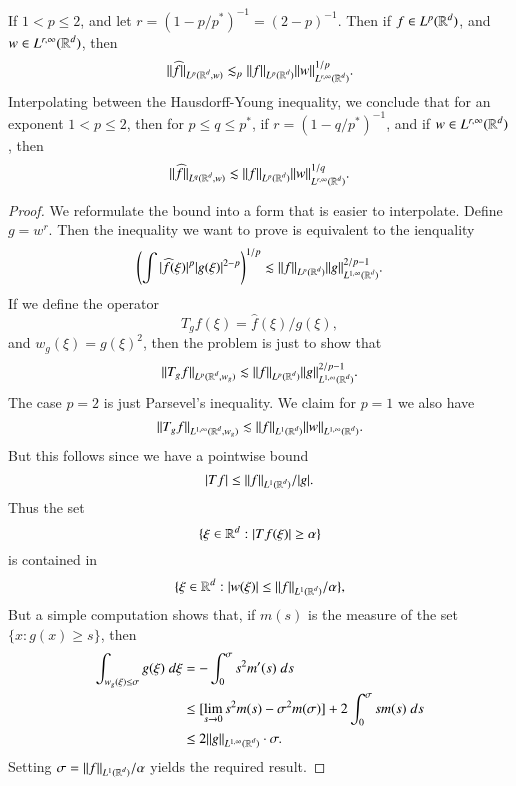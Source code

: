 \begin{corollary}
    If $1 < p \leq 2$, and let $r = (1 - p/p^*)^{-1} = (2-p)^{-1}$. Then if $f \in L^p(\operatorname{\mathbb{R}}^d)$, and $w \in L^{r,\infty}(\operatorname{\mathbb{R}}^d)$, then
    \[ \| \widehat{f} \|_{L^p(\operatorname{\mathbb{R}}^d, w)} \lesssim_p \| f \|_{L^p(\operatorname{\mathbb{R}}^d)} \| w \|_{L^{r,\infty}(\operatorname{\mathbb{R}}^d)}^{1/p}. \]
    Interpolating between the Hausdorff-Young inequality, we conclude that for an exponent $1 < p \leq 2$, then for $p \leq q \leq p^*$, if $r = (1 - q/p^*)^{-1}$, and if $w \in L^{r,\infty}(\operatorname{\mathbb{R}}^d)$, then
    \[ \| \widehat{f} \|_{L^q(\operatorname{\mathbb{R}}^d,w)} \lesssim \| f \|_{L^p(\operatorname{\mathbb{R}}^d)} \| w \|_{L^{r,\infty}(\operatorname{\mathbb{R}}^d)}^{1/q}. \]
\end{corollary}
\begin{proof}
    We reformulate the bound into a form that is easier to interpolate. Define $g = w^r$. Then the inequality we want to prove is equivalent to the ienquality
    \[ \left( \int |\widehat{f}(\xi)|^p |g(\xi)|^{2-p} \right)^{1/p} \lesssim \| f \|_{L^p(\operatorname{\mathbb{R}}^d)} \| g \|_{L^{1,\infty}(\operatorname{\mathbb{R}}^d)}^{2/p - 1}. \]
    If we define the operator
    \[ T_gf(\xi) = \widehat{f}(\xi) / g(\xi), \]
    and $w_g(\xi) = g(\xi)^2$, then the problem is just to show that
    \[ \| T_g f \|_{L^p(\operatorname{\mathbb{R}}^d,w_g)} \lesssim \| f \|_{L^p(\operatorname{\mathbb{R}}^d)} \| g \|_{L^{1,\infty}(\operatorname{\mathbb{R}}^d)}^{2/p - 1}. \]
    The case $p = 2$ is just Parsevel's inequality. We claim for $p = 1$ we also have
    \[ \| T_g f \|_{L^{1,\infty}(\operatorname{\mathbb{R}}^d,w_g)} \lesssim \| f \|_{L^1(\operatorname{\mathbb{R}}^d)} \| w \|_{L^{1,\infty}(\operatorname{\mathbb{R}}^d)}. \]
    But this follows since we have a pointwise bound
    \[ |Tf| \leq \| f \|_{L^1(\operatorname{\mathbb{R}}^d)} / |g|. \]
    Thus the set
    \[ \{ \xi \in \operatorname{\mathbb{R}}^d : |Tf(\xi)| \geq \alpha \} \]
    is contained in
    \[ \{ \xi \in \operatorname{\mathbb{R}}^d : |w(\xi)| \leq \| f \|_{L^1(\operatorname{\mathbb{R}}^d)} / \alpha \}, \]
    But a simple computation shows that, if $m(s)$ is the measure of the set $\{ x : g(x) \geq s \}$, then
    \begin{align*}
        \int_{w_g(\xi) \leq \sigma} g(\xi)\; d\xi &= - \int_0^\sigma s^2 m'(s)\; ds\\
        &\leq [\lim_{s \to 0} s^2 m(s) - \sigma^2 m(\sigma)] + 2 \int_0^\sigma s m(s)\; ds\\
        &\leq 2 \| g \|_{L^{1,\infty}(\operatorname{\mathbb{R}}^d)} \cdot \sigma.
    \end{align*}
    Setting $\sigma = \| f \|_{L^1(\operatorname{\mathbb{R}}^d)} / \alpha$ yields the required result.
\end{proof}

